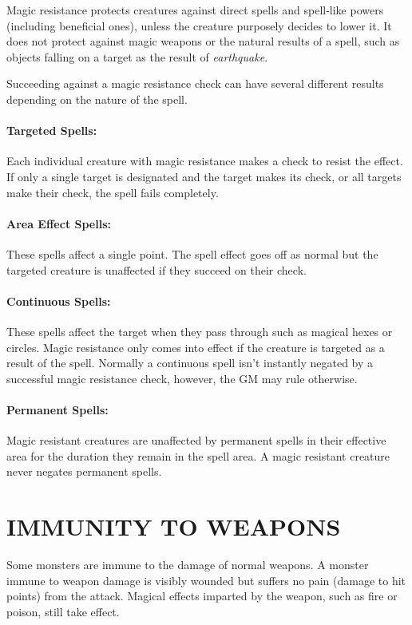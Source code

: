 \begin{multicols}{2}
Magic resistance protects creatures against direct spells and spell-like powers (including beneficial ones), unless the creature purposely decides to lower it.  It does not protect against magic weapons or the natural results of a spell, such as objects falling on a target as the result of \textit{earthquake}.  

Succeeding against a magic resistance check can have several different results depending on the nature of the spell.

\paragraph{Targeted Spells:} Each individual creature with magic resistance makes a check to resist the effect.  If only a single target is designated and the target makes its check, or all targets make their check, the spell fails completely.

\paragraph{Area Effect Spells:} These spells affect a single point.  The spell effect goes off as normal but the targeted creature is unaffected if they succeed on their check.

\paragraph{Continuous Spells:} These spells affect the target when they pass through such as magical hexes or circles.  Magic resistance only comes into effect if the creature is targeted as a result of the spell.  Normally a continuous spell isn't instantly negated by a successful magic resistance check, however, the GM may rule otherwise.

\paragraph{Permanent Spells:} Magic resistant creatures are unaffected by permanent spells in their effective area for the duration they remain in the spell area.  A magic resistant creature never negates permanent spells.

\section{IMMUNITY TO WEAPONS}

Some monsters are immune to the damage of normal weapons.  A monster immune to weapon damage is visibly wounded but suffers no pain (damage to hit points) from the attack.  Magical effects imparted by the weapon, such as fire or poison, still take effect.


\end{multicols}
